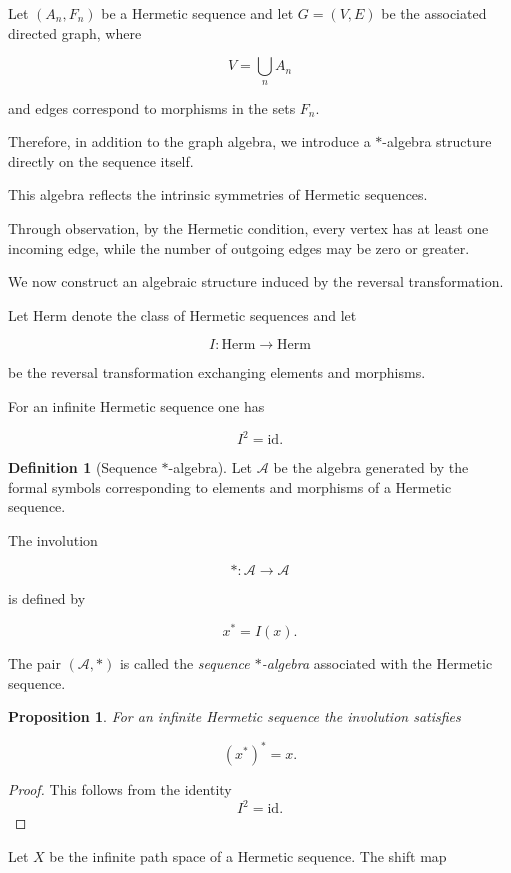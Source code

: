 \documentclass[11pt]{book}
\theoremstyle{definition}
\newtheorem{definition}{Definition}[section]
\theoremstyle{plain}
\newtheorem{proposition}[theorem]{Proposition}
\theoremstyle{remark}
\begin{document}
Let $(A_n,F_n)$ be a Hermetic sequence and let
$G=(V,E)$ be the associated directed graph, where

\[
V=\bigcup_n A_n
\]

and edges correspond to morphisms in the sets $F_n$.

Therefore, in addition to the graph algebra,
we introduce a $*$-algebra structure
directly on the sequence itself.

This algebra reflects the intrinsic symmetries
of Hermetic sequences.

Through observation, by the Hermetic condition, every vertex has at least
one incoming edge, while the number of outgoing edges
may be zero or greater.

We now construct an algebraic structure induced by
the reversal transformation.

Let $\mathrm{Herm}$ denote the class of Hermetic
sequences and let

\[
I:\mathrm{Herm}\to\mathrm{Herm}
\]

be the reversal transformation exchanging elements
and morphisms.

For an infinite Hermetic sequence one has

\[
I^2=\mathrm{id}.
\]

\begin{definition}[Sequence $*$-algebra]
Let $\mathcal{A}$ be the algebra generated by the
formal symbols corresponding to elements and
morphisms of a Hermetic sequence.

The involution

\[
*: \mathcal{A}\to\mathcal{A}
\]

is defined by

\[
x^* = I(x).
\]

The pair $(\mathcal{A},*)$ is called the
\emph{sequence $*$-algebra} associated with the
Hermetic sequence.
\end{definition}

\begin{proposition}
For an infinite Hermetic sequence the involution
satisfies

\[
(x^*)^* = x .
\]
\end{proposition}

\begin{proof}
This follows from the identity
\[
I^2=\mathrm{id}.
\]
\end{proof}

Let $X$ be the infinite path space of a Hermetic
sequence. The shift map
\end{document}
